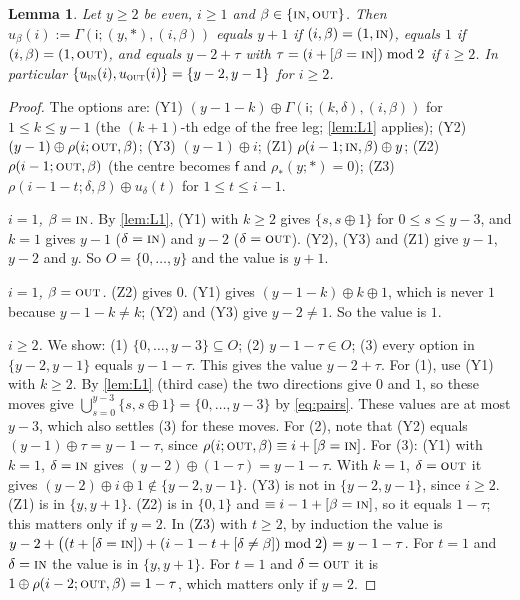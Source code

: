 \documentclass[11pt]{amsart}
\newtheorem{lemma}[theorem]{Lemma}
\theoremstyle{definition}
\theoremstyle{remark}
\newcommand{\si}{\mathsf{i}}
\newcommand{\sff}{\mathsf{f}}
\newcommand{\free}{\ast}
\newcommand{\IN}{\textup{\textsc{in}}}
\newcommand{\OUT}{\textup{\textsc{out}}}
\begin{document}
\begin{lemma}\label{lem:L3}
Let $y\ge2$ be even, $i\ge1$ and $\beta\in\{\IN,\OUT\}$. Then $u_\beta(i):=\Gamma(\si;(y,\free),(i,\beta))$ equals $y+1$ if $(i,\beta)=(1,\IN)$, equals $1$ if $(i,\beta)=(1,\OUT)$, and equals $y-2+\tau$ with $\tau=(i+[\beta=\IN])\bmod 2$ if $i\ge2$. In particular $\{u_\IN(i),u_\OUT(i)\}=\{y-2,y-1\}$ for $i\ge2$.
\end{lemma}

\begin{proof}
The options are:
(Y1) $(y-1-k)\oplus\Gamma(\si;(k,\delta),(i,\beta))$ for $1\le k\le y-1$ (the $(k+1)$-th edge of the free leg; \cref{lem:L1} applies);
(Y2) $(y-1)\oplus\rho(i;\OUT,\beta)$;
(Y3) $(y-1)\oplus i$;
(Z1) $\rho(i-1;\IN,\beta)\oplus y$;
(Z2) $\rho(i-1;\OUT,\beta)$ (the centre becomes $\sff$ and $\rho_\free(y;\free)=0$);
(Z3) $\rho(i-1-t;\delta,\beta)\oplus u_\delta(t)$ for $1\le t\le i-1$.

\emph{$i=1$, $\beta=\IN$.} By \cref{lem:L1}, (Y1) with $k\ge2$ gives $\{s,s\oplus1\}$ for $0\le s\le y-3$, and $k=1$ gives $y-1$ ($\delta=\IN$) and $y-2$ ($\delta=\OUT$). (Y2), (Y3) and (Z1) give $y-1$, $y-2$ and $y$. So $O=\{0,\dots,y\}$ and the value is $y+1$.

\emph{$i=1$, $\beta=\OUT$.} (Z2) gives $0$. (Y1) gives $(y-1-k)\oplus k\oplus1$, which is never $1$ because $y-1-k\ne k$; (Y2) and (Y3) give $y-2\ne1$. So the value is $1$.

\emph{$i\ge2$.} We show: (1) $\{0,\dots,y-3\}\subseteq O$; (2) $y-1-\tau\in O$; (3) every option in $\{y-2,y-1\}$ equals $y-1-\tau$. This gives the value $y-2+\tau$.
For (1), use (Y1) with $k\ge2$. By \cref{lem:L1} (third case) the two directions give $0$ and $1$, so these moves give $\bigcup_{s=0}^{y-3}\{s,s\oplus1\}=\{0,\dots,y-3\}$ by \eqref{eq:pairs}. These values are at most $y-3$, which also settles (3) for these moves.
For (2), note that (Y2) equals $(y-1)\oplus\tau=y-1-\tau$, since $\rho(i;\OUT,\beta)\equiv i+[\beta=\IN]$.
For (3): (Y1) with $k=1$, $\delta=\IN$ gives $(y-2)\oplus(1-\tau)=y-1-\tau$. With $k=1$, $\delta=\OUT$ it gives $(y-2)\oplus i\oplus1\notin\{y-2,y-1\}$. (Y3) is not in $\{y-2,y-1\}$, since $i\ge2$. (Z1) is in $\{y,y+1\}$. (Z2) is in $\{0,1\}$ and $\equiv i-1+[\beta=\IN]$, so it equals $1-\tau$; this matters only if $y=2$. In (Z3) with $t\ge2$, by induction the value is $y-2+\bigl((t+[\delta=\IN])+(i-1-t+[\delta\ne\beta])\bmod 2\bigr)=y-1-\tau$. For $t=1$ and $\delta=\IN$ the value is in $\{y,y+1\}$. For $t=1$ and $\delta=\OUT$ it is $1\oplus\rho(i-2;\OUT,\beta)=1-\tau$, which matters only if $y=2$.
\end{proof}
\end{document}
